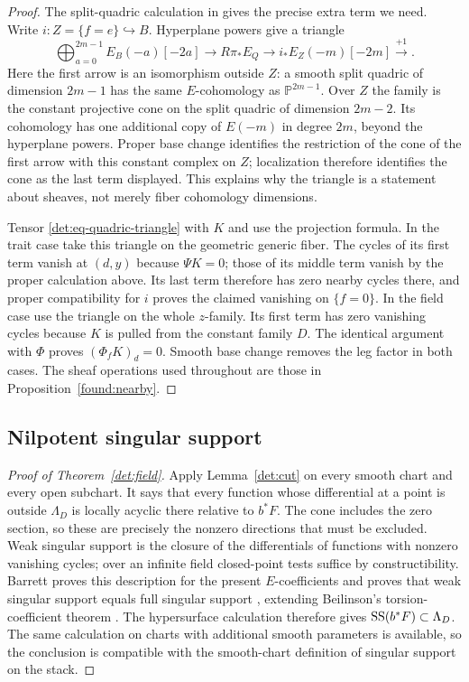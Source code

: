 \begin{proof}
The split-quadric calculation in
\cite[proof of Lemma~4.3]{CT} gives the precise extra term we need.
Write $i:Z=\{f=e\}\hookrightarrow B$. Hyperplane powers give a triangle
\begin{equation}\label{det:eq-quadric-triangle}
 \bigoplus_{a=0}^{2m-1}E_B(-a)[-2a]\longrightarrow R\pi_*E_Q
 \longrightarrow i_*E_Z(-m)[-2m]\xrightarrow{+1}.
\end{equation}
Here the first arrow is an isomorphism outside $Z$: a smooth split
quadric of dimension $2m-1$ has the same $E$-cohomology as
$\mathbb P^{2m-1}$. Over $Z$ the family is the constant projective cone
on the split quadric of dimension $2m-2$. Its cohomology has one
additional copy of $E(-m)$ in degree $2m$, beyond the hyperplane
powers. Proper base change identifies the restriction of the cone of
the first arrow with this constant complex on $Z$; localization
therefore identifies the cone as the last term displayed. This explains
why the triangle is a statement about sheaves, not merely fiber
cohomology dimensions.

Tensor \eqref{det:eq-quadric-triangle} with $K$ and use the
projection formula.  In the trait case take this triangle on the
geometric generic fiber.  The cycles of its first term vanish at
$(d,y)$ because $\Psi K=0$; those of its middle term vanish by the
proper calculation above.  Its last term therefore has zero nearby
cycles there, and proper compatibility for $i$ proves the claimed
vanishing on $\{f=0\}$.  In the field case use the triangle on the
whole $z$-family.  Its first term has zero vanishing cycles because
$K$ is pulled from the constant family $D$.  The identical argument
with $\Phi$ proves $(\Phi_f K)_d=0$.  Smooth base change removes the
leg factor in both cases.  The sheaf operations used throughout are
those in Proposition~\ref{found:nearby}.
\end{proof}

\subsection{Nilpotent singular support}

\begin{proof}[Proof of Theorem~\ref{det:field}]
Apply Lemma~\ref{det:cut} on every smooth chart and
every open subchart.  It says that every function whose differential
at a point is outside $\Lambda_D$ is locally acyclic there relative to
$b^*F$.  The cone includes the zero section, so these are precisely the
nonzero directions that must be excluded.  Weak singular support is
the closure of the differentials of functions with nonzero vanishing
cycles; over an infinite field closed-point tests suffice by
constructibility.  Barrett proves this description for the present
$E$-coefficients and proves that weak singular support equals full
singular support \cite[\S\S1.4--1.5, Theorem~(vii)]{Barrett}, extending
Beilinson's torsion-coefficient theorem \cite[\S1.5]{Beilinson}.
The hypersurface calculation therefore gives
$\operatorname{SS}(b^*F)\subset\Lambda_D$.  The same calculation on charts with
additional smooth parameters is available, so the conclusion is
compatible with the smooth-chart definition of singular support on
the stack.
\end{proof}


